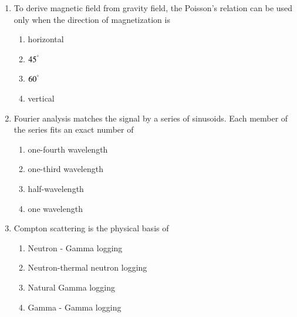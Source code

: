 \documentclass[journal,12pt,onecolumn]{IEEEtran}
\theoremstyle{remark}
\begin{document}
\begin{enumerate}
    \item To derive magnetic field from gravity field, the Poisson's relation can be used only when the direction of magnetization is

    \hfill{}
    
    \begin{multicols}{2}
        \begin{enumerate}
            \item horizontal 
            \item $45^{\degree}$
            \item $60^{\degree}$
            \item vertical 
        \end{enumerate}
    \end{multicols}

    \item Fourier analysis matches the signal by a series of sinusoids. Each member of the series fits an exact number of

    \hfill{}
    
    \begin{multicols}{2}
        \begin{enumerate}
            \item one-fourth wavelength
            \item one-third wavelength
            \item half-wavelength
            \item one wavelength
        \end{enumerate}
    \end{multicols}

    \item Compton scattering is the physical basis of

    \hfill{}
    
    \begin{multicols}{2}
        \begin{enumerate}
            \item Neutron - Gamma logging
            \item Neutron-thermal neutron logging
            \item Natural Gamma logging
            \item Gamma - Gamma logging
        \end{enumerate}
    \end{multicols}


\end{enumerate}
\end{document}
